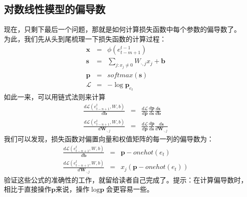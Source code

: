 \documentclass[10pt,a4paper]{ctexart}
\begin{document}
\subsection{对数线性模型的偏导数}
现在，只剩下最后一个问题，那就是如何计算损失函数中每个参数的偏导数了。
为此，我们先从头到尾梳理一下损失函数的计算过程：
\begin{eqnarray}
 \textbf{x} & = & \phi (e_{t-m+1}^{t-1}) \label{eq:25} \\
 \textbf{s} & = & \sum_{j:x_j \neq 0} W_{\cdot,j}x_j + \textbf{b} \label{eq:26} \\
 \textbf{p} & = & softmax(\textbf{s}) \label{eq:27} \\
 \mathcal{L} & = & - \log \textbf{p}_{e_t} \label{eq:28}
\end{eqnarray}
如此一来，可以用链式法则来计算
\begin{eqnarray}
 \frac{d\mathcal{L}(e_{t-n+1}^t,W,b)}{d\textbf{b}} & = & \frac{d\mathcal{L}}{d\textbf{p}}\frac{d\textbf{p}}{d\textbf{s}}\frac{d\textbf{s}}{d\textbf{b}} \label{eq:29} \\
 \frac{d\mathcal{L}(e_{t-n+1}^t,W,b)}{d\textbf{W}_{\cdot,j}} & = & \frac{d\mathcal{L}}{d\textbf{p}}\frac{d\textbf{p}}{d\textbf{s}}\frac{d\textbf{s}}{d\textbf{W}_{\cdot,j}} \label{eq:30}
\end{eqnarray}
我们可以发现，损失函数对偏置向量和权值矩阵的每一列的偏导数为：
\begin{eqnarray}
 \frac{d\mathcal{L}(e_{t-n+1}^t,W,b)}{d\textbf{b}} & = & \textbf{p} - onehot(e_t) \label{eq:31} \\
 \frac{d\mathcal{L}(e_{t-n+1}^t,W,b)}{d\textbf{W}_{\cdot,j}} & = & x_j (\textbf{p} - onehot(e_t)) \label{eq:32}
\end{eqnarray}
验证这些公式的准确性的工作，就留给读者自己完成了。提示：在计算偏导数时，相比于直接操作$\textbf{p}$来说，操作$\log \textbf{p}$会更容易一些。
\end{document}
